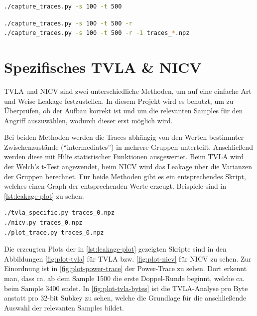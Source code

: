 \documentclass[a4paper,ngerman]{scrreprt}
\begin{document}
\begin{lstlisting}[language=bash, caption={Traces für Variante 1 aufzeichnen}, label=lst:capture-1]
./capture_traces.py -s 100 -t 500
\end{lstlisting}

\begin{lstlisting}[language=bash, caption={Traces für Variante 2 aufzeichnen}, label=lst:capture-2]
./capture_traces.py -s 100 -t 500 -r
./capture_traces.py -s 100 -t 500 -r -1 traces_*.npz
\end{lstlisting}


\section{Spezifisches TVLA \& NICV}

TVLA und NICV sind zwei unterschiedliche Methoden, um auf eine einfache Art und
Weise Leakage festzustellen. In diesem Projekt wird es benutzt, um zu
Überprüfen, ob der Aufbau korrekt ist und um die relevanten Samples für den
Angriff auszuwählen, wodurch dieser erst möglich wird.

Bei beiden Methoden werden die Traces abhängig von den Werten bestimmter
Zwischenzustände (``intermediates'') in mehrere Gruppen unterteilt. Anschließend
werden diese mit Hilfe statistischer Funktionen ausgewertet. Beim TVLA wird der
Welch's t-Test angewendet, beim NICV wird das Leakage über die Varianzen der
Gruppen berechnet. Für beide Methoden gibt es ein entsprechendes Skript, welches
einen Graph der entsprechenden Werte erzeugt. Beispiele sind in
\autoref{lst:leakage-plot} zu sehen.

\begin{lstlisting}[language=bash, caption={Plots von TVLA \& NICV}, label=lst:leakage-plot]
./tvla_specific.py traces_0.npz
./nicv.py traces_0.npz
./plot_trace.py traces_0.npz
\end{lstlisting}

\medskip

Die erzeugten Plots der in \autoref{lst:leakage-plot} gezeigten Skripte sind in
den Abbildungen \autoref{fig:plot-tvla} für TVLA bzw. \autoref{fig:plot-nicv}
für NICV zu sehen. Zur Einordnung ist in \autoref{fig:plot-power-trace} der
Power-Trace zu sehen. Dort erkennt man, dass ca. ab dem Sample 1500 die erste
Doppel-Runde beginnt, welche ca. beim Sample 3400 endet. In
\autoref{fig:plot-tvla-bytes} ist die TVLA-Analyse pro Byte anstatt pro 32-bit
Subkey zu sehen, welche die Grundlage für die anschließende Auswahl der
relevanten Samples bildet.
\end{document}
